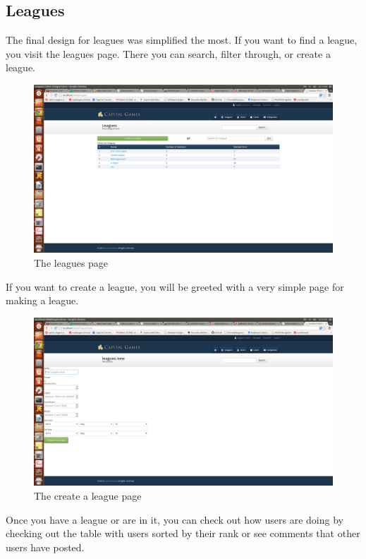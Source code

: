 \subsection{Leagues}
The final design for leagues was simplified the most. If you want to find a league, you visit the leagues page. There you can search, filter through, or create a league. 
\begin{figure}[H]
\centering
\includegraphics[width=5.5in]{./img/finalDesign/leagues.png}
\caption{The leagues page}
\end{figure}
If you want to create a league, you will be greeted with a very simple page for making a league.
\begin{figure}[H]
\centering
\includegraphics[width=5.5in]{./img/finalDesign/createleague.png}
\caption{The create a league page}
\end{figure}
Once you have a league or are in it, you can check out how users are doing by checking out the table with users sorted by their rank or see comments that other users have posted.
